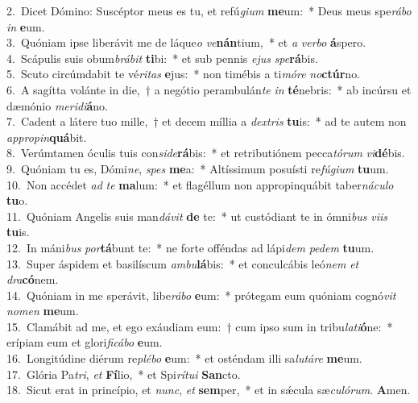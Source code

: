 {2.~}Dicet Dómino: Suscéptor meus es tu, et refú\textit{gi}\textit{um} \textbf{me}um:~* Deus meus spe\textit{rá}\textit{bo} \textit{in} \textbf{e}um.\\
{3.~}Quóniam ipse liberávit me de láque\textit{o} \textit{ve}\textbf{nán}tium,~* et \textit{a} \textit{ver}\textit{bo} \textbf{á}spero.\\
{4.~}Scápulis suis obum\textit{brá}\textit{bit} \textbf{ti}bi:~* et sub pennis \textit{e}\textit{jus} \textit{spe}\textbf{rá}bis.\\
{5.~}Scuto circúmdabit te vé\textit{ri}\textit{tas} \textbf{e}jus:~* non timébis a ti\textit{mó}\textit{re} \textit{no}\textbf{ctúr}no.\\
{6.~}A sagítta volánte in die,~† a negótio perambulán\textit{te} \textit{in} \textbf{té}nebris:~* ab incúrsu et dæmónio \textit{me}\textit{ri}\textit{di}\textbf{á}no.\\
{7.~}Cadent a látere tuo mille,~† et decem míllia a \textit{dex}\textit{tris} \textbf{tu}is:~* ad te autem non \textit{ap}\textit{pro}\textit{pin}\textbf{quá}bit.\\
{8.~}Verúmtamen óculis tuis con\textit{si}\textit{de}\textbf{rá}bis:~* et retributiónem pecca\textit{tó}\textit{rum} \textit{vi}\textbf{dé}bis.\\
{9.~}Quóniam tu es, Dómi\textit{ne}, \textit{spes} \textbf{me}a:~* Altíssimum posuísti re\textit{fú}\textit{gi}\textit{um} \textbf{tu}um.\\
{10.~}Non accédet \textit{ad} \textit{te} \textbf{ma}lum:~* et flagéllum non appropinquábit taber\textit{ná}\textit{cu}\textit{lo} \textbf{tu}o.\\
{11.~}Quóniam Angelis suis man\textit{dá}\textit{vit} \textbf{de} te:~* ut custódiant te in ómni\textit{bus} \textit{vi}\textit{is} \textbf{tu}is.\\
{12.~}In máni\textit{bus} \textit{por}\textbf{tá}bunt te:~* ne forte offéndas ad lápi\textit{dem} \textit{pe}\textit{dem} \textbf{tu}um.\\
{13.~}Super áspidem et basilíscum \textit{am}\textit{bu}\textbf{lá}bis:~* et conculcábis leó\textit{nem} \textit{et} \textit{dra}\textbf{có}nem.\\
{14.~}Quóniam in me sperávit, libe\textit{rá}\textit{bo} \textbf{e}um:~* prótegam eum quóniam cognó\textit{vit} \textit{no}\textit{men} \textbf{me}um.\\
{15.~}Clamábit ad me, et ego exáudiam eum:~† cum ipso sum in tribu\textit{la}\textit{ti}\textbf{ó}ne:~* erípiam eum et glori\textit{fi}\textit{cá}\textit{bo} \textbf{e}um.\\
{16.~}Longitúdine diérum re\textit{plé}\textit{bo} \textbf{e}um:~* et osténdam illi sa\textit{lu}\textit{tá}\textit{re} \textbf{me}um.\\
{17.~}Glória Pa\textit{tri}, \textit{et} \textbf{Fí}lio,~* et Spi\textit{rí}\textit{tu}\textit{i} \textbf{San}cto.\\
{18.~}Sicut erat in princípio, et \textit{nunc}, \textit{et} \textbf{sem}per,~* et in sǽcula sæ\textit{cu}\textit{ló}\textit{rum}. \textbf{A}men.\\
